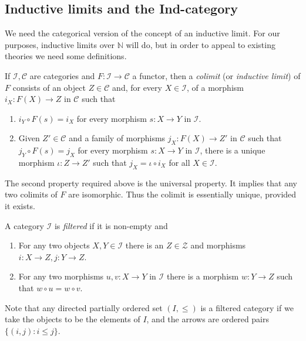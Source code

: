 \documentclass[11pt]{article}
\theoremstyle{definition}
\theoremstyle{definition}
\theoremstyle{remark}
\def\2#1{{\mathcal #1}}
\def\7#1{{\mathbb #1}}
\newcommand{\rarr}{\rightarrow}
\begin{document}


\subsection{Inductive limits and the Ind-category}  \label{ss-ind}
We need the categorical version of the concept of an inductive  limit. For our purposes, inductive
limits over $\7N$ will do, but in order to appeal to existing theories we need some definitions.

\bdefin If $\2I,\2C$ are categories and $F:\2I\rarr\2C$ a functor, then a \emph{colimit} (or 
\emph{inductive limit}) of $F$ consists of an object $Z\in\2C$ and, for every $X\in\2I$, of a
morphism $i_X:F(X)\rarr Z$ in  $\2C$ such that 
\begin{enumerate}
\item $i_Y\circ F(s)=i_X$ for every morphism $s:X\rarr Y$ in $\2I$.
\item Given $Z'\in\2C$ and a family of morphisms $j_X:F(X)\rarr Z'$ in $\2C$ such that 
$j_Y\circ F(s)=j_X$ for every morphism $s:X\rarr Y$ in $\2I$, there is a unique morphism 
$\iota:Z\rarr Z'$ such that $j_X=\iota\circ i_X$ for all $X\in\2I$.
\end{enumerate}
\edefin

The second property required above is the universal property. It implies that any two colimits of
$F$ are isomorphic. Thus the colimit is essentially unique, provided it exists.

\bdefin \label{def-filtered}
A category $\2I$ is \emph{filtered} if it is non-empty and 
\begin{enumerate}
\item For any two objects $X,Y\in\2I$ there is an $Z\in\2Z$ and morphisms $i:X\rarr Z, j:Y\rarr Z$.
\item For any two morphisms $u,v:X\rarr Y$ in $\2I$ there is a morphism $w:Y\rarr Z$ such that
$w\circ u=w\circ v$.
\end{enumerate}
\edefin

Note that any directed partially ordered set $(I,\leq )$ is a filtered category if we take the
objects to be the elements of $I$, and the arrows are ordered pairs $\{ (i,j):i\leq j\}$.
\end{document}
